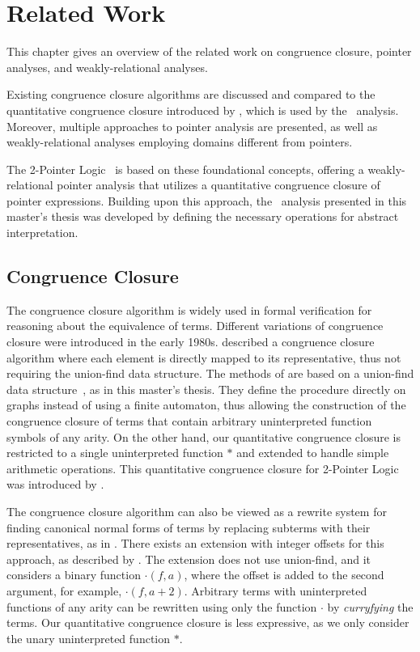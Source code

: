 \chapter{Related Work}\label{chapter:related-work}

This chapter gives an overview of the related work on congruence closure, pointer analyses, and weakly-relational analyses.

Existing congruence closure algorithms are discussed and compared to the quantitative congruence closure introduced by \textcite{2pointer},
which is used by the \cpo\ analysis.
Moreover, multiple approaches to pointer analysis are presented, as well as weakly-relational analyses employing domains different from pointers.

The 2-Pointer Logic~\cite{2pointer} is based on these foundational concepts, offering a weakly-relational pointer analysis that utilizes a quantitative congruence closure of pointer expressions.
Building upon this approach, the \cpo\ analysis presented in this master's thesis was developed by defining the necessary operations for abstract interpretation.

\section{Congruence Closure}

The congruence closure algorithm is widely used in formal verification for reasoning about the equivalence of terms.
Different variations of congruence closure were introduced in the early 1980s.
\textcite{cc-tarjan} described a congruence closure algorithm
where each element is directly mapped to its representative, thus not requiring the union-find data structure.
The methods of \textcite{cc-nelson,cc-shostak} are based on a union-find data structure~\cite{uf-tarjan}, as in this master's thesis.
They define the procedure directly on graphs instead of using a finite automaton, thus allowing the construction of the congruence closure of terms that contain arbitrary uninterpreted function symbols of any arity.
On the other hand, our quantitative congruence closure is restricted to a single uninterpreted function $*$ and extended to handle simple arithmetic operations.
This quantitative congruence closure for 2-Pointer Logic was introduced by \textcite{2pointer}.

The congruence closure algorithm can also be viewed as a rewrite system for finding canonical normal forms of terms by replacing subterms with their representatives, as in \cite{cc-kapur,abstract-cc}.
There exists an extension with integer offsets for this approach, as described by \textcite{cc-offsets}.
The extension does not use union-find, and it considers a binary function $\cdot(f, a)$, where the offset is added to the second argument, for example, $\cdot(f, a + 2)$.
Arbitrary terms with uninterpreted functions of any arity can be rewritten using only the function $\cdot$ by \emph{curryfying} the terms.
Our quantitative congruence closure is less expressive, as we only consider the unary uninterpreted function $*$.

